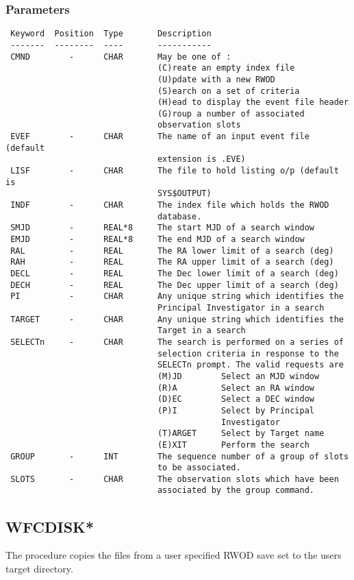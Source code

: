 \documentclass{book}
\renewcommand{\_}{{\tt\char'137}}     %
\begin{document}
\subsubsection{Parameters}
\begin{verbatim}
 Keyword  Position  Type       Description
 -------  --------  ----       -----------
 CMND        -      CHAR       May be one of :
                               (C)reate an empty index file
                               (U)pdate with a new RWOD
                               (S)earch on a set of criteria
                               (H)ead to display the event file header
                               (G)roup a number of associated
                               observation slots
 EVEF        -      CHAR       The name of an input event file (default
                               extension is .EVE)
 LISF        -      CHAR       The file to hold listing o/p (default is
                               SYS$OUTPUT)
 INDF        -      CHAR       The index file which holds the RWOD
                               database.
 SMJD        -      REAL*8     The start MJD of a search window
 EMJD        -      REAL*8     The end MJD of a search window
 RAL         -      REAL       The RA lower limit of a search (deg)
 RAH         -      REAL       The RA upper limit of a search (deg)
 DECL        -      REAL       The Dec lower limit of a search (deg)
 DECH        -      REAL       The Dec upper limit of a search (deg)
 PI          -      CHAR       Any unique string which identifies the
                               Principal Investigator in a search
 TARGET      -      CHAR       Any unique string which identifies the
                               Target in a search
 SELECTn     -      CHAR       The search is performed on a series of
                               selection criteria in response to the
                               SELECTn prompt. The valid requests are
                               (M)JD        Select an MJD window
                               (R)A         Select an RA window
                               (D)EC        Select a DEC window
                               (P)I         Select by Principal
                                            Investigator
                               (T)ARGET     Select by Target name
                               (E)XIT       Perform the search
 GROUP       -      INT        The sequence number of a group of slots
                               to be associated.
 SLOTS       -      CHAR       The observation slots which have been
                               associated by the group command.

\end{verbatim}\subsection{WFCDISK*}
The procedure copies the files from a user specified RWOD save set
to the users target directory.
\end{document}
